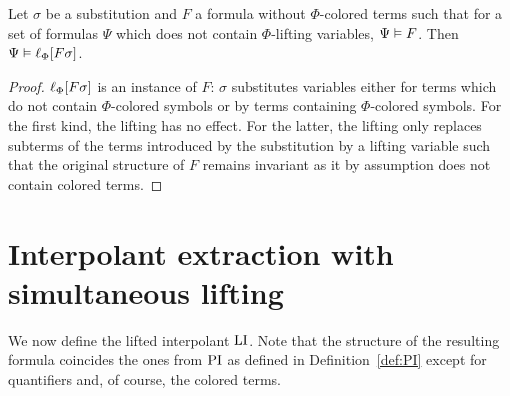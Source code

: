 \begin{lemma}
	\label{lemma:substitute_and_lift}
	Let $\sigma$ be a substitution and $F$ a formula without $\Phi$-colored terms such that for a set of formulas $\Psi$ which does not contain $\Phi$-lifting variables, $\Psi \vDash F$.
	Then $\Psi \vDash \ell_{\Phi}[F\sigma]$.
\end{lemma}
\begin{proof}
	$\ell_{\Phi}[F\sigma]$ is an instance of $F$:
	$\sigma$ substitutes variables either for terms which do not contain $\Phi$-colored symbols or by terms containing $\Phi$-colored symbols.
	For the first kind, the lifting has no effect.
	For the latter, the lifting only replaces subterms of the terms introduced by the substitution by a lifting variable such that the original structure of $F$ remains invariant as it by assumption does not contain colored terms.
\end{proof}


\section{Interpolant extraction with simultaneous lifting}

We now define the lifted interpolant $\operatorname{LI}$.
Note that the structure of the resulting formula coincides the ones from $\operatorname{PI}$ as defined in Definition~\ref{def:PI} except for quantifiers and, of course, the colored terms.

